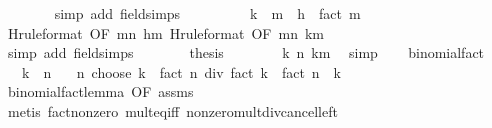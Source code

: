 \begin{isabellebody}
\ \ \ \ \ \ \isamarkupfalse%
\ {\isacharparenleft}{\kern0pt}simp\ add{\isacharcolon}{\kern0pt}\ field{\isacharunderscore}{\kern0pt}simps{\isacharparenright}{\kern0pt}\isanewline
\ \ \ \ \isamarkupfalse%
\ \isamarkupfalse%
\ {\isachardoublequoteopen}{\isasymdots}\ {\isacharequal}{\kern0pt}\ {\isacharparenleft}{\kern0pt}k\ {\isacharplus}{\kern0pt}\ {\isacharparenleft}{\kern0pt}m\ {\isacharminus}{\kern0pt}\ h{\isacharparenright}{\kern0pt}{\isacharparenright}{\kern0pt}\ {\isacharasterisk}{\kern0pt}\ fact\ m{\isachardoublequoteclose}\isanewline
\ \ \ \ \ \ \isamarkupfalse%
\ H{\isacharbrackleft}{\kern0pt}rule{\isacharunderscore}{\kern0pt}format{\isacharcomma}{\kern0pt}\ OF\ mn\ hm{\isacharprime}{\kern0pt}{\isacharbrackright}{\kern0pt}\ H{\isacharbrackleft}{\kern0pt}rule{\isacharunderscore}{\kern0pt}format{\isacharcomma}{\kern0pt}\ OF\ mn\ km{\isacharbrackright}{\kern0pt}\isanewline
\ \ \ \ \ \ \isamarkupfalse%
\ {\isacharparenleft}{\kern0pt}simp\ add{\isacharcolon}{\kern0pt}\ field{\isacharunderscore}{\kern0pt}simps{\isacharparenright}{\kern0pt}\isanewline
\ \ \ \ \isamarkupfalse%
\ \isamarkupfalse%
\ {\isacharquery}{\kern0pt}thesis\isanewline
\ \ \ \ \ \ \isamarkupfalse%
\ k\ n\ km\ \isamarkupfalse%
\ simp\isanewline
\ \ \isamarkupfalse%
\isanewline
{}\isamarkupfalse%
%
\endisatagproof
{\isafoldproof}%
%
\isadelimproof
\isanewline
%
\endisadelimproof
\isanewline
{}\isamarkupfalse%
\ binomial{\isacharunderscore}{\kern0pt}fact{\isacharprime}{\kern0pt}{\isacharcolon}{\kern0pt}\isanewline
\ \ \ {\isachardoublequoteopen}k\ {\isasymle}\ n{\isachardoublequoteclose}\isanewline
\ \ \ {\isachardoublequoteopen}n\ choose\ k\ {\isacharequal}{\kern0pt}\ fact\ n\ div\ {\isacharparenleft}{\kern0pt}fact\ k\ {\isacharasterisk}{\kern0pt}\ fact\ {\isacharparenleft}{\kern0pt}n\ {\isacharminus}{\kern0pt}\ k{\isacharparenright}{\kern0pt}{\isacharparenright}{\kern0pt}{\isachardoublequoteclose}\isanewline
%
\isadelimproof
\ \ %
\endisadelimproof
%
\isatagproof
{}\isamarkupfalse%
\ binomial{\isacharunderscore}{\kern0pt}fact{\isacharunderscore}{\kern0pt}lemma\ {\isacharbrackleft}{\kern0pt}OF\ assms{\isacharbrackright}{\kern0pt}\isanewline
\ \ \isamarkupfalse%
\ {\isacharparenleft}{\kern0pt}metis\ fact{\isacharunderscore}{\kern0pt}nonzero\ mult{\isacharunderscore}{\kern0pt}eq{\isacharunderscore}{\kern0pt}{}{\isacharunderscore}{\kern0pt}iff\ nonzero{\isacharunderscore}{\kern0pt}mult{\isacharunderscore}{\kern0pt}div{\isacharunderscore}{\kern0pt}cancel{\isacharunderscore}{\kern0pt}left{\isacharparenright}{\kern0pt}%

\end{isabellebody}
